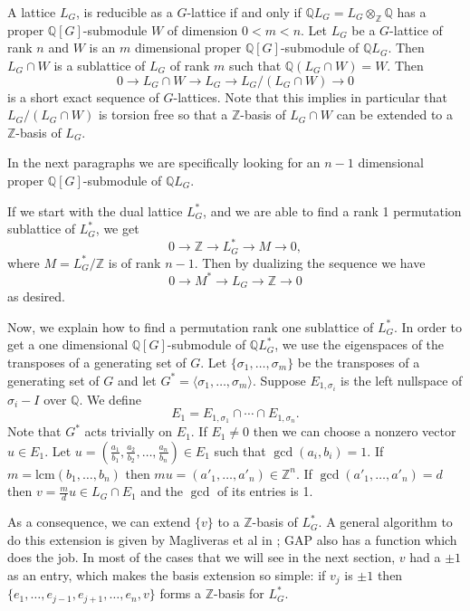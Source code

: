 \documentclass[12pt]{article}
\theoremstyle{plain}
\theoremstyle{definition}
\newcommand{\Z}{\ensuremath{\mathbb{Z}}}
\newcommand{\Q}{\ensuremath{\mathbb{Q}}}
\begin{document}
A lattice $L_G$, is reducible as a $G$-lattice if and only if $\Q L_G = L_G \otimes_{\Z} \Q$ 
has a proper $\Q[G]$-submodule $W$ of dimension $0 < m < n$. Let $L_G$ be a $G$-lattice of 
rank $n$ and $W$ is an $m$ dimensional proper $\Q[G]$-submodule of $\Q L_G$. Then $L_G \cap W$ 
is a sublattice of $L_G$ of rank $m$ such that $\Q (L_G \cap W) = W$. Then
$$0 \rightarrow L_G \cap W  \rightarrow L_G \rightarrow L_G/(L_G \cap W) \rightarrow 0$$
 is a short exact sequence of $G$-lattices. Note that this implies in particular that $L_G/(L_G \cap W)$ 
 is torsion free so that a $\Z$-basis of $L_G \cap W$ can be extended to a $\Z$-basis of $L_G$.
 
In the next paragraphs we are specifically looking for an $n-1$ dimensional proper 
$\Q[G]$-submodule of $\Q L_G$.

If we start with the dual lattice $L^*_G$, and we are able to find a rank 1 permutation 
sublattice of $L^*_G$, we get $$0 \rightarrow \Z  \rightarrow L^*_G \rightarrow M \rightarrow 0,$$ 
where $M = L^*_G/\Z$ is of rank $n-1$. Then by dualizing the sequence we have 
$$0 \rightarrow M^*  \rightarrow L_G \rightarrow \Z \rightarrow 0$$ as desired.

Now, we explain how to find a permutation rank one sublattice of $L^*_G$. In order 
to get a one dimensional $\Q[G]$-submodule of $\Q L^*_G$, we use the eigenspaces of 
the transposes of a generating set of $G$. Let  $\lbrace \sigma_1, \ldots, \sigma_m\rbrace$ 
be the transposes of a generating set of $G$ and let  $G^* = \langle \sigma_1, \ldots, \sigma_m\rangle$. 
Suppose $E_{1,\sigma_i}$ is the left nullspace of $\sigma_i-I$ over $\Q$. 
We define $$E_1 = E_{1,\sigma_1}\cap \cdots \cap E_{1,\sigma_n}. $$
Note that $G^*$ acts trivially on $E_1$. If $E_1\neq {0}$ then we can choose a 
nonzero vector $u \in E_1$. Let $u = (\frac{a_1}{b_1}, \frac{a_2}{b_2}, \ldots , \frac{a_n}{b_n})\in E_1$ 
such that $\gcd(a_i, b_i) = 1$. If $m = \mathrm{lcm}(b_1, \ldots, b_n)$ then 
$m u = (a'_1, \ldots, a'_n) \in\Z^n$. If $\gcd (a'_1, \ldots, a'_n) = d$ then 
$v =\frac{m}{d} u \in L_G \cap E_1$ and the $\gcd$ of its entries is 1. 

As a consequence, we can extend $\lbrace v \rbrace$ to a $\Z$-basis of $L^*_G$. 
A general algorithm to do this extension is given by Magliveras et al in 
\cite{LatticeBase}; GAP also has a function which does the job. In most of the 
cases that we will see in the next section, $v$ had a $\pm 1$ as an entry, which makes 
the basis extension so simple: if $v_j$ is $\pm 1$ then 
$\lbrace e_1, \ldots , e_{j-1}, e_{j+1}, \ldots, e_n , v \rbrace$ forms a $\Z$-basis for $L^*_G$.
\end{document}
